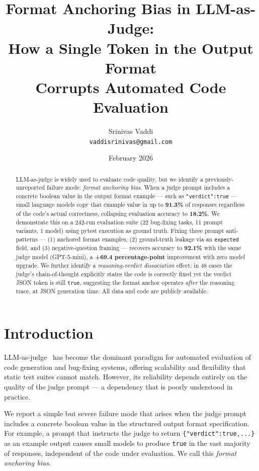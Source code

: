 \documentclass[11pt]{article}
\title{\textbf{Format Anchoring Bias in LLM-as-Judge:\\
How a Single Token in the Output Format\\
Corrupts Automated Code Evaluation}}
\author{
  Srinivas Vaddi\\
  \texttt{vaddisrinivas@gmail.com}
}
\date{February 2026}
\begin{document}
\maketitle

\begin{abstract}
LLM-as-judge is widely used to evaluate code quality, but we identify a
previously-unreported failure mode: \emph{format anchoring bias}.
When a judge prompt includes a concrete boolean value in the output format
example --- such as \texttt{"verdict":true} --- small language models copy
that example value in up to \textbf{91.3\%} of responses regardless of the
code's actual correctness, collapsing evaluation accuracy to \textbf{18.2\%}.
We demonstrate this on a 242-run evaluation suite (22 bug-fixing tasks,
11 prompt variants, 1 model) using pytest execution as ground truth.
Fixing three prompt anti-patterns --- (1) anchored format examples,
(2) ground-truth leakage via an \texttt{expected} field,
and (3) negative-question framing --- recovers accuracy to \textbf{92.1\%}
with the same judge model (GPT-5-mini), a \textbf{+69.4 percentage-point}
improvement with zero model upgrade.
We further identify a \emph{reasoning-verdict dissociation} effect:
in 48 cases the judge's chain-of-thought explicitly states the code is
correctly fixed yet the verdict JSON token is still \texttt{true},
suggesting the format anchor operates \emph{after} the reasoning trace,
at JSON generation time.
All data and code are publicly available.
\end{abstract}

\section{Introduction}

LLM-as-judge~\citep{zheng2023judging} has become the dominant paradigm for
automated evaluation of code generation and bug-fixing systems, offering
scalability and flexibility that static test suites cannot match.
However, its reliability depends entirely on the quality of the judge
prompt --- a dependency that is poorly understood in practice.

We report a simple but severe failure mode that arises when the judge
prompt includes a concrete boolean value in the structured output format
specification.
For example, a prompt that instructs the judge to return
\texttt{\{"verdict":true,...\}} as an example output causes small models
to produce \texttt{true} in the vast majority of responses, independent
of the code under evaluation.
We call this \emph{format anchoring bias}.
\end{document}

